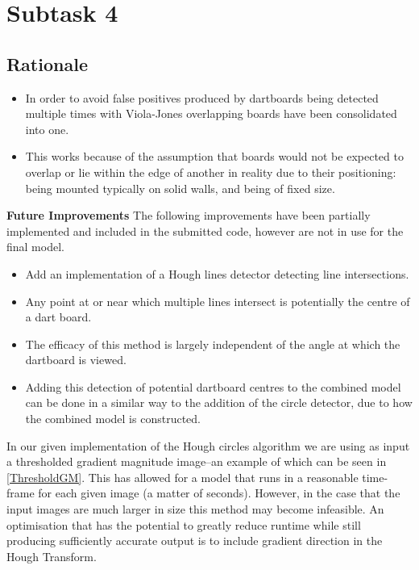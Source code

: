 \documentclass[conference]{IEEEtran}
\begin{document}
\newpage
\section{Subtask 4}

\subsection{Rationale}
\begin{itemize}
	\item In order to avoid false positives produced by dartboards being detected multiple times with Viola-Jones overlapping boards have been consolidated into one.
	\item This works because of the assumption that boards would not be expected to overlap or lie within the edge of another in reality due to their positioning: being mounted typically on solid walls, and being of fixed size.
\end{itemize}

\textbf{Future Improvements}
The following improvements have been partially implemented and included in the submitted code, however are not in use for the final model.
\begin{itemize}
	\item Add an implementation of a Hough lines detector detecting line intersections. 
	\item Any point at or near which multiple lines intersect is potentially the centre of a dart board.
	\item The efficacy of this method is largely independent of the angle at which the dartboard is viewed.
	\item Adding this detection of potential dartboard centres to the combined model can be done in a similar way to the addition of the circle detector, due to how the combined model is constructed.
\end{itemize}

In our given implementation of the Hough circles algorithm we are using as input a thresholded gradient magnitude image--an example of which can be seen in \cref{ThresholdGM}. This has allowed for a model that runs in a reasonable time-frame for each given image (a matter of seconds). However, in the case that the input images are much larger in size this method may become infeasible. An optimisation that has the potential to greatly reduce runtime while still producing sufficiently accurate output is to include gradient direction in the Hough Transform.
\end{document}
